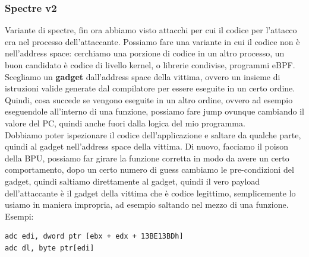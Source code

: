 \documentclass[12pt, oneside]{extbook} %
\begin{document}
\subsubsection{Spectre v2}
Variante di spectre, fin ora abbiamo visto attacchi per cui il codice per l'attacco era nel processo dell'attaccante. Possiamo fare una variante in cui il codice non è nell'address space: cerchiamo una porzione di codice in un altro processo, un buon candidato è codice di livello kernel, o librerie condivise, programmi eBPF. Scegliamo un \textbf{gadget} dall'address space della vittima, ovvero un insieme di istruzioni valide generate dal compilatore per essere eseguite in un certo ordine. Quindi, cosa succede se vengono eseguite in un altro ordine, ovvero ad esempio eseguendole all'interno di una funzione, possiamo fare jump ovunque cambiando il valore del PC, quindi anche fuori dalla logica del mio programma.\\ Dobbiamo poter ispezionare il codice dell'applicazione e saltare da qualche parte, quindi al gadget nell'address space della vittima. Di nuovo, facciamo il poison della BPU, possiamo far girare la funzione corretta in modo da avere un certo comportamento, dopo un certo numero di guess cambiamo le pre-condizioni del gadget, quindi saltiamo direttamente al gadget, quindi il vero payload dell'attaccante è il gadget della vittima che è codice legittimo, semplicemente lo usiamo in maniera impropria, ad esempio saltando nel mezzo di una funzione.\\ Esempi:
\begin{lstlisting}
adc edi, dword ptr [ebx + edx + 13BE13BDh]
adc dl, byte ptr[edi]
\end{lstlisting}
\end{document}
